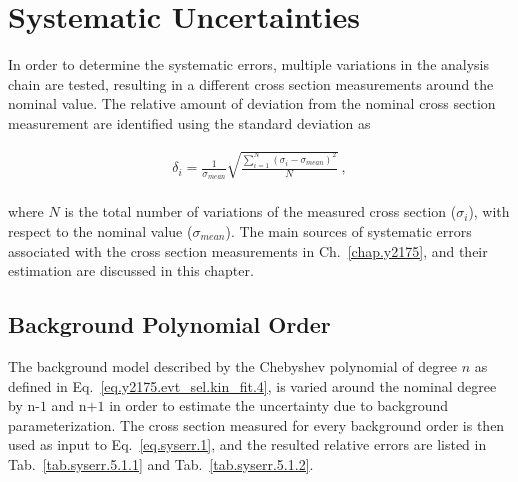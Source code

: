 \chapter{Systematic Uncertainties}
\label{chap.syserr}

In order to determine the systematic errors, multiple variations in the analysis chain are tested, resulting in a different cross section measurements around the nominal value. The relative amount of deviation from the nominal cross section measurement are identified using the standard deviation as

\begin{equation}
    \label{eq.syserr.1}
    \begin{aligned}
        \delta_{i} = \frac{1}{\sigma_{mean}} \sqrt{\frac{\sum\limits_{i=1}^{N} (\sigma_{i} - \sigma_{mean})^2}{N}}~,\\
    \end{aligned}
\end{equation}

\noindent where $N$ is the total number of variations of the measured cross section ($\sigma_{i}$), with respect to the nominal value ($\sigma_{mean}$). The main sources of systematic errors associated with the cross section measurements in Ch.~\ref{chap.y2175}, and their estimation are discussed in this chapter.

\section{Background Polynomial Order}

The background model described by the Chebyshev polynomial of degree $n$ as defined in Eq.~\ref{eq.y2175.evt_sel.kin_fit.4}, is varied around the nominal degree by $\mbox{n-1}$ and $\mbox{n+1}$ in order to estimate the uncertainty due to background parameterization. The cross section measured for every background order is then used as input to Eq.~\ref{eq.syserr.1}, and the resulted relative errors are listed in Tab.~\ref{tab.syserr.5.1.1} and Tab.~\ref{tab.syserr.5.1.2}.

